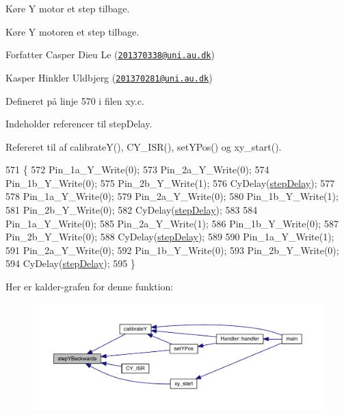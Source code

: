 Køre Y motor et step tilbage. 

Køre Y motoren et step tilbage.

\begin{DoxyAuthor}{Forfatter}
Casper Dieu Le (\href{mailto:201370338@uni.au.dk}{\tt 201370338@uni.\+au.\+dk}) 

Kasper Hinkler Uldbjerg (\href{mailto:201370281@uni.au.dk}{\tt 201370281@uni.\+au.\+dk}) 
\end{DoxyAuthor}


Defineret på linje 570 i filen xy.\+c.



Indeholder referencer til step\+Delay.



Refereret til af calibrate\+Y(), C\+Y\+\_\+\+I\+S\+R(), set\+Y\+Pos() og xy\+\_\+start().


\begin{DoxyCode}
571 \{
572   Pin\_1a\_Y\_Write(0);
573   Pin\_2a\_Y\_Write(0);
574   Pin\_1b\_Y\_Write(0);
575   Pin\_2b\_Y\_Write(1);
576   CyDelay(\hyperlink{xy_8h_af24cf99e186a696ed4f58aff71d09249}{stepDelay});
577   
578   Pin\_1a\_Y\_Write(0);
579   Pin\_2a\_Y\_Write(0);
580   Pin\_1b\_Y\_Write(1);
581   Pin\_2b\_Y\_Write(0);
582   CyDelay(\hyperlink{xy_8h_af24cf99e186a696ed4f58aff71d09249}{stepDelay});
583   
584   Pin\_1a\_Y\_Write(0);
585   Pin\_2a\_Y\_Write(1);
586   Pin\_1b\_Y\_Write(0);
587   Pin\_2b\_Y\_Write(0);
588   CyDelay(\hyperlink{xy_8h_af24cf99e186a696ed4f58aff71d09249}{stepDelay});
589   
590   Pin\_1a\_Y\_Write(1);
591   Pin\_2a\_Y\_Write(0);
592   Pin\_1b\_Y\_Write(0);
593   Pin\_2b\_Y\_Write(0);
594   CyDelay(\hyperlink{xy_8h_af24cf99e186a696ed4f58aff71d09249}{stepDelay});
595 \}
\end{DoxyCode}


Her er kalder-\/grafen for denne funktion\+:
\nopagebreak
\begin{figure}[H]
\begin{center}
\leavevmode
\includegraphics[width=350pt]{db/d87/class_x_y_aea96dacda1955992c5436dcb829daa26_icgraph}
\end{center}
\end{figure}


